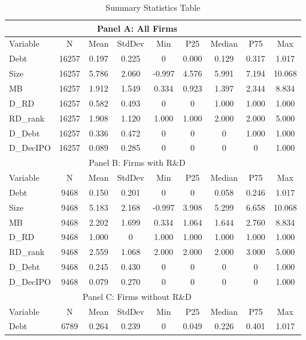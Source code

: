 \documentclass[12pt, times]{article}
\begin{document}
\begin{table}[h!]
    \centering
    \caption{Summary Statistics Table}
    \label{table:1}
    \begin{tabular}{lcccccccc}
        \toprule
        \multicolumn{8}{c}{Panel A: All Firms} \\
        \midrule
        Variable & N & Mean & StdDev & Min & P25 & Median & P75 & Max \\
        \midrule
        Debt & 16257 & 0.197 & 0.225 & 0 & 0.000 & 0.129 & 0.317 & 1.017 \\
        Size & 16257 & 5.786 & 2.060 & -0.997 & 4.576 & 5.991 & 7.194 & 10.068 \\
        MB & 16257 & 1.912 & 1.549 & 0.334 & 0.923 & 1.397 & 2.344 & 8.834 \\
        D\_RD & 16257 & 0.582 & 0.493 & 0 & 0 & 1.000 & 1.000 & 1.000 \\
        RD\_rank & 16257 & 1.908 & 1.120 & 1.000 & 1.000 & 2.000 & 2.000 & 5.000 \\
        D\_Debt & 16257 & 0.336 & 0.472 & 0 & 0 & 0 & 1.000 & 1.000 \\
        D\_DecIPO & 16257 & 0.089 & 0.285 & 0 & 0 & 0 & 0 & 1.000 \\
        \midrule
        \multicolumn{8}{c}{Panel B: Firms with R\&D} \\
        \midrule
        Variable & N & Mean & StdDev & Min & P25 & Median & P75 & Max \\
        \midrule
        Debt & 9468 & 0.150 & 0.201 & 0 & 0 & 0.058 & 0.246 & 1.017 \\
        Size & 9468 & 5.183 & 2.168 & -0.997 & 3.908 & 5.299 & 6.658 & 10.068 \\
        MB & 9468 & 2.202 & 1.699 & 0.334 & 1.064 & 1.644 & 2.760 & 8.834 \\
        D\_RD & 9468 & 1.000 & 0 & 1.000 & 1.000 & 1.000 & 1.000 & 1.000 \\
        RD\_rank & 9468 & 2.559 & 1.068 & 2.000 & 2.000 & 2.000 & 3.000 & 5.000 \\
        D\_Debt & 9468 & 0.245 & 0.430 & 0 & 0 & 0 & 0 & 1.000 \\
        D\_DecIPO & 9468 & 0.079 & 0.270 & 0 & 0 & 0 & 0 & 1.000 \\
        \midrule
        \multicolumn{8}{c}{Panel C: Firms without R\&D} \\
        \midrule
        Variable & N & Mean & StdDev & Min & P25 & Median & P75 & Max \\
        \midrule
        Debt & 6789 & 0.264 & 0.239 & 0 & 0.049 & 0.226 & 0.401 & 1.017 \\

\end{tabular}
\end{table}
\end{document}
